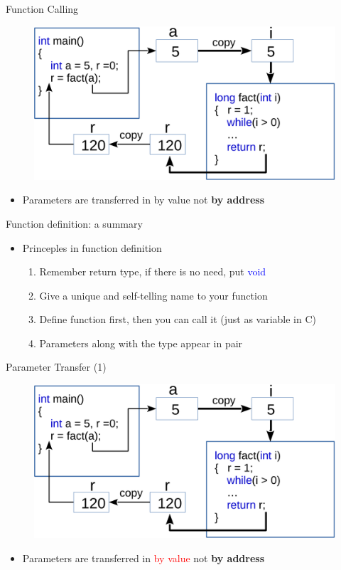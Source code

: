\begin{frame}[fragile]{Function Calling}
\begin{figure}
	\includegraphics[width=0.85\linewidth]{figs/arg2para.pdf}
\end{figure}
\begin{itemize}
	\item {Parameters are transferred in by value not \textbf{by address}}
\end{itemize}
\end{frame}

\begin{frame}[fragile]{Function definition: a summary}
\LARGE{
\begin{itemize}
	\item {Princeples in function definition}
	\begin{enumerate}
		\item {Remember return type, if there is no need, put \textcolor{blue}{void}}
		\item {Give a unique and self-telling name to your function}
		\item {Define function first, then you can call it (just as variable in C)}
		\item {Parameters along with the type appear in pair}
	\end{enumerate}
\end{itemize}
}
\end{frame}

\begin{frame}[fragile]{Parameter Transfer (1)}
\begin{figure}
	\includegraphics[width=0.85\linewidth]{figs/arg2para.pdf}
\end{figure}
\begin{itemize}
	\item {Parameters are transferred in \textcolor{red}{by value} not \textbf{by address}}
\end{itemize}
\end{frame}

